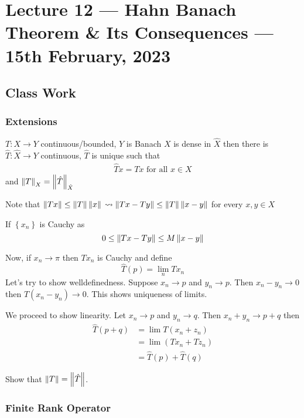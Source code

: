 \section{Lecture 12 --- Hahn Banach Theorem \& Its Consequences --- 15th February, 2023}
\horz
\subsection{Class Work}
\subsubsection{Extensions}
$T: X\to Y$ continuous/bounded, $Y$ is Banach
$X$ is dense in $\hat{X}$ then there is $\hat{T}: \hat{X}\to Y$ continuous, $\hat{T}$ is unique such that
\begin{align*}
    \hat{T}x=Tx \text{ for all } x\in X
\end{align*}
and $\left\lVert T \right\rVert_{X} = \left\lVert \hat{T} \right\rVert_{\hat{X}}$

Note that $\left\lVert Tx \right\rVert \le \left\lVert T \right\rVert\left\lVert x \right\rVert$
$\leadsto \left\lVert Tx-Ty \right\rVert \le \left\lVert T \right\rVert \left\lVert x-y \right\rVert$ for every $x,y\in X$

If $\left\{ x_{n} \right\}$ is Cauchy as
\begin{equation*}
    0 \le \left\lVert Tx-Ty \right\rVert \le M\left\lVert x-y \right\rVert
\end{equation*}

Now, if $x_{n} \to \pi$ then $Tx_{n}$ is Cauchy and define
\begin{equation*}
    \hat{T} (p) = \lim_{n} Tx_{n}
\end{equation*}
Let's try to show welldefinedness. Suppose $x_{n} \to p$ and $y_{n} \to p$. Then $x_{n} - y_{n} \to 0$ then $T\left( x_{n} - y_{n} \right) \to 0$. This shows uniqueness of limits.

We proceed to show linearity. Let $x_{n} \to p$ and $y_{n} \to q$. Then $x_{n} + y_{n} \to p +q$ then 
\begin{align*}
    \hat{T} \left( p+q \right) &= \lim T\left( x_{n} + z_{n} \right) \\
    &= \lim \left( Tx_{n} + Tz_{n} \right) \\
    &= \hat{T} \left( p \right) + \hat{T} \left( q \right)
\end{align*}

Show that $\left\lVert T \right\rVert = \left\lVert \hat{T} \right\rVert$.

\subsubsection{Finite Rank Operator}

